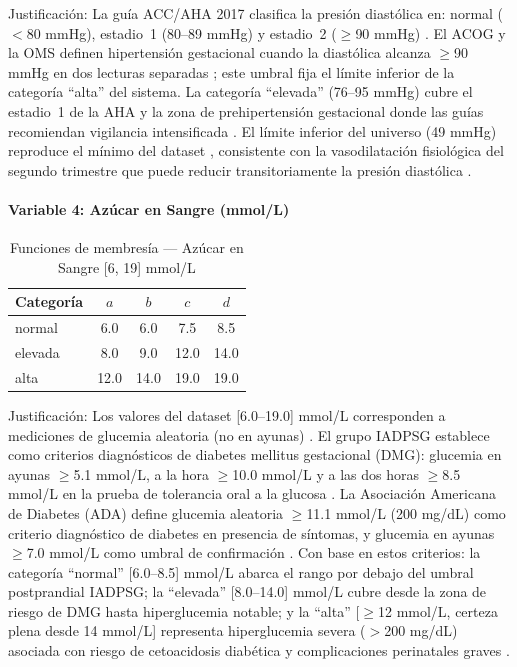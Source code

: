 \documentclass[11pt]{article}
\begin{document}
Justificaci\'on: La gu\'ia ACC/AHA 2017 clasifica la presi\'on diast\'olica en: normal ($<$80 mmHg), estadio~1 (80--89 mmHg) y estadio~2 ($\geq$90 mmHg) \cite{whelton2018}. El ACOG y la OMS definen hipertensi\'on gestacional cuando la diast\'olica alcanza $\geq$90 mmHg en dos lecturas separadas \cite{acog2020,who2011hypertension}; este umbral fija el l\'imite inferior de la categor\'ia ``alta'' del sistema. La categor\'ia ``elevada'' (76--95 mmHg) cubre el estadio~1 de la AHA y la zona de prehipertensi\'on gestacional donde las gu\'ias recomiendan vigilancia intensificada \cite{whelton2018}. El l\'imite inferior del universo (49 mmHg) reproduce el m\'inimo del dataset \cite{ahmed2020}, consistente con la vasodilataci\'on fisiol\'ogica del segundo trimestre que puede reducir transitoriamente la presi\'on diast\'olica \cite{monga1995}.

\paragraph{Variable 4: Azúcar en Sangre (mmol/L)}

\begin{table}[H]
    \centering
    \caption{Funciones de membres\'ia --- Az\'ucar en Sangre [6, 19] mmol/L}
    \begin{tabular}{lcccc}
        \toprule
        \textbf{Categoría} & $a$  & $b$  & $c$  & $d$  \\
        \midrule
        normal             & 6.0  & 6.0  & 7.5  & 8.5  \\
        elevada            & 8.0  & 9.0  & 12.0 & 14.0 \\
        alta               & 12.0 & 14.0 & 19.0 & 19.0 \\
        \bottomrule
    \end{tabular}
    \par{}
\end{table}

Justificaci\'on: Los valores del dataset [6.0--19.0] mmol/L corresponden a mediciones de glucemia aleatoria (no en ayunas) \cite{ahmed2020}. El grupo IADPSG establece como criterios diagn\'osticos de diabetes mellitus gestacional (DMG): glucemia en ayunas $\geq$5.1 mmol/L, a la hora $\geq$10.0 mmol/L y a las dos horas $\geq$8.5 mmol/L en la prueba de tolerancia oral a la glucosa \cite{iadpsg2010}. La Asociaci\'on Americana de Diabetes (ADA) define glucemia aleatoria $\geq$11.1 mmol/L (200 mg/dL) como criterio diagn\'ostico de diabetes en presencia de s\'intomas, y glucemia en ayunas $\geq$7.0 mmol/L como umbral de confirmaci\'on \cite{ada2024}. Con base en estos criterios: la categor\'ia ``normal'' [6.0--8.5] mmol/L abarca el rango por debajo del umbral postprandial IADPSG; la ``elevada'' [8.0--14.0] mmol/L cubre desde la zona de riesgo de DMG hasta hiperglucemia notable; y la ``alta'' [$\geq$12 mmol/L, certeza plena desde 14 mmol/L] representa hiperglucemia severa ($>$200 mg/dL) asociada con riesgo de cetoacidosis diab\'etica y complicaciones perinatales graves \cite{ada2024}.
\end{document}
